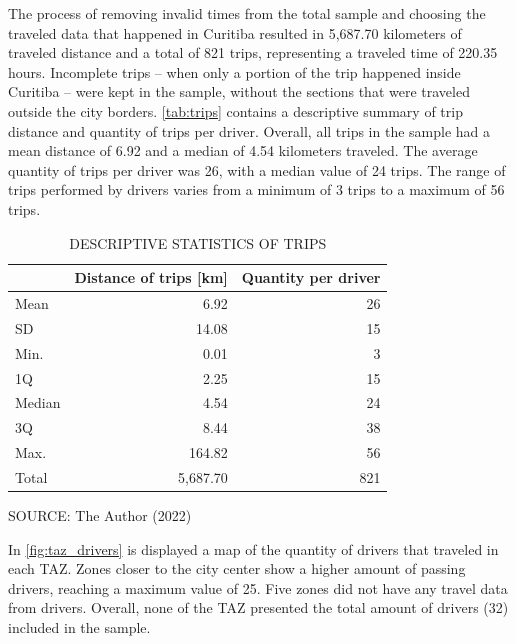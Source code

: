 The process of removing invalid times from the total sample and choosing the traveled data that happened in Curitiba resulted in 5,687.70 kilometers of traveled distance and a total of 821 trips, representing a traveled time of 220.35 hours. Incomplete trips – when only a portion of the trip happened inside Curitiba – were kept in the sample, without the sections that were traveled outside the city borders. \autoref{tab:trips} contains a descriptive summary of trip distance and quantity of trips per driver. Overall, all trips in the sample had a mean distance of 6.92 and a median of 4.54 kilometers traveled. The average quantity of trips per driver was 26, with a median value of 24 trips. The range of trips performed by drivers varies from a minimum of 3 trips to a maximum of 56 trips. 

\begin{table}[!htbp]
    \footnotesize
    \captionsetup{justification=raggedright, singlelinecheck=false,
    font=footnotesize}
    \caption{DESCRIPTIVE STATISTICS OF TRIPS}
    \centering
    \begin{tabular}{lrr}
        \hline
         & \multicolumn{1}{c}{\textbf{Distance of trips [km]}} & \multicolumn{1}{c}{\textbf{Quantity per driver}} \\
        \hline
        Mean   &     6.92 & 26 \\
        SD     &    14.08 & 15 \\
        Min.   &     0.01 &  3 \\
        1Q     &     2.25 & 15 \\
        Median &     4.54 & 24 \\
        3Q     &     8.44 & 38 \\
        Max.   &   164.82 & 56 \\
        \hline
        Total  & 5,687.70 & 821 \\
        \hline
    \end{tabular}
    \label{tab:trips}
    \par \vspace{2mm} \footnotesize \raggedright
    SOURCE: The Author (2022)
\end{table}

In \autoref{fig:taz_drivers} is displayed a map of the quantity of drivers that traveled in each TAZ. Zones closer to the city center show a higher amount of passing drivers, reaching a maximum value of 25. Five zones did not have any travel data from drivers. Overall, none of the TAZ presented the total amount of drivers (32) included in the sample.

